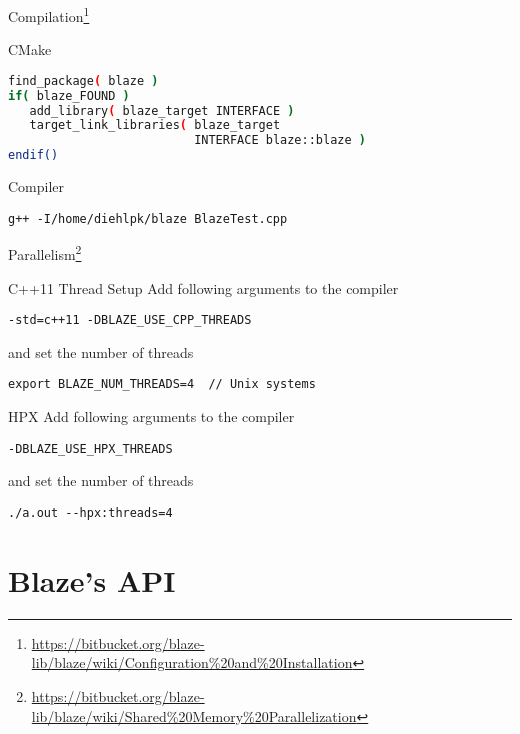 \documentclass[\classoption]{beamer}
\begin{document}
\begin{frame}[fragile]{Compilation\footnote{\tiny\url{https://bitbucket.org/blaze-lib/blaze/wiki/Configuration\%20and\%20Installation}}}

\begin{block}{CMake}
\begin{lstlisting}[language=bash]
find_package( blaze )
if( blaze_FOUND )
   add_library( blaze_target INTERFACE )
   target_link_libraries( blaze_target 
                          INTERFACE blaze::blaze )
endif()
\end{lstlisting}
\end{block}

\begin{block}{Compiler}
\begin{lstlisting}
g++ -I/home/diehlpk/blaze BlazeTest.cpp
\end{lstlisting}
\end{block}

\end{frame}


\begin{frame}[fragile]{Parallelism\footnote{\tiny\url{https://bitbucket.org/blaze-lib/blaze/wiki/Shared\%20Memory\%20Parallelization}}}

\begin{block}{C++11 Thread Setup}
Add following arguments to the compiler
\begin{lstlisting}
-std=c++11 -DBLAZE_USE_CPP_THREADS
\end{lstlisting}
and set the number of threads
\begin{lstlisting}
export BLAZE_NUM_THREADS=4  // Unix systems
\end{lstlisting}
\end{block}

\begin{block}{HPX}
Add following arguments to the compiler
\begin{lstlisting}
-DBLAZE_USE_HPX_THREADS
\end{lstlisting}
and set the number of threads
\begin{lstlisting}
./a.out --hpx:threads=4
\end{lstlisting}
\end{block}

\end{frame}

\section{Blaze's API}
\end{document}

